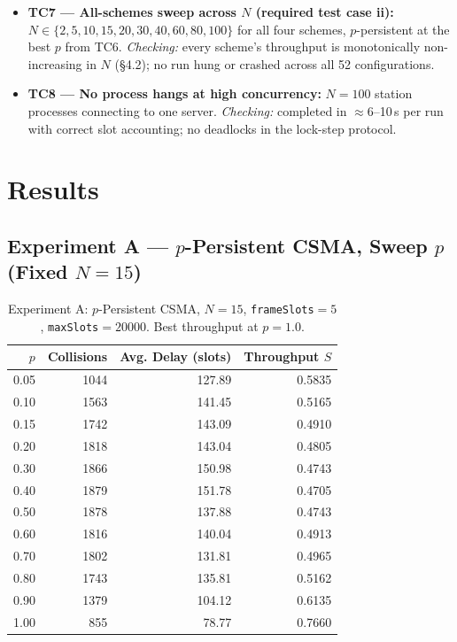 \documentclass[11pt]{article}
\begin{document}
\begin{itemize}[leftmargin=1.6em]
  all vary non-monotonically with $p$ (\S4.1), matching the classic trade-off between
  excess deferral (low $p$) and excess collision (mid $p$).
  \item \textbf{TC7 --- All-schemes sweep across $N$ (required test case ii):} $N \in
  \{2,5,10,15,20,30,40,60,80,100\}$ for all four schemes, $p$-persistent at the best $p$
  from TC6. \emph{Checking:} every scheme's throughput is monotonically non-increasing in
  $N$ (\S4.2); no run hung or crashed across all 52 configurations.
  \item \textbf{TC8 --- No process hangs at high concurrency:} $N{=}100$ station processes
  connecting to one server. \emph{Checking:} completed in $\approx$6--10\,s per run with
  correct slot accounting; no deadlocks in the lock-step protocol.
\end{itemize}

\section{Results}

\subsection{Experiment A --- $p$-Persistent CSMA, Sweep $p$ (Fixed $N=15$)}
\label{sec:expA}

\begin{table}[H]
\centering
\small
\begin{tabular}{rrrr}
\toprule
\textbf{$p$} & \textbf{Collisions} & \textbf{Avg. Delay (slots)} & \textbf{Throughput $S$} \\
\midrule
0.05 & 1044 & 127.89 & 0.5835 \\
0.10 & 1563 & 141.45 & 0.5165 \\
0.15 & 1742 & 143.09 & 0.4910 \\
0.20 & 1818 & 143.04 & 0.4805 \\
0.30 & 1866 & 150.98 & 0.4743 \\
0.40 & 1879 & 151.78 & 0.4705 \\
0.50 & 1878 & 137.88 & 0.4743 \\
0.60 & 1816 & 140.04 & 0.4913 \\
0.70 & 1802 & 131.81 & 0.4965 \\
0.80 & 1743 & 135.81 & 0.5162 \\
0.90 & 1379 & 104.12 & 0.6135 \\
1.00 & 855  & 78.77  & 0.7660 \\
\bottomrule
\end{tabular}
\caption{Experiment A: $p$-Persistent CSMA, $N=15$, \texttt{frameSlots}$=5$,
\texttt{maxSlots}$=20000$. Best throughput at $p=1.0$.}
\label{tab:expA}
\end{table}
\end{document}
